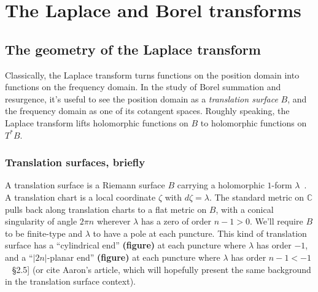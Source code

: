 \documentclass{article}
\theoremstyle{definition}
\newcommand{\C}{\mathbb{C}}
\begin{document}
\section{The Laplace and Borel transforms}\label{sec:Laplace-Borel-general}
\subsection{The geometry of the Laplace transform}

Classically, the Laplace transform turns functions on the position domain into functions on the frequency domain. In the study of Borel summation and resurgence, it's useful to see the position domain as a {\em translation surface} $B$, and the frequency domain as one of its cotangent spaces. Roughly speaking, the Laplace transform lifts holomorphic functions on $B$ to holomorphic functions on $T^* B$.
\subsubsection{Translation surfaces, briefly}

A translation surface is a Riemann surface $B$ carrying a holomorphic $1$-form $\lambda$~\cite{zorich2006flat}. A translation chart is a local coordinate $\zeta$ with $d\zeta = \lambda$. The standard metric on $\C$ pulls back along translation charts to a flat metric on $B$, with a conical singularity of angle $2\pi n$ wherever $\lambda$ has a zero of order $n-1 > 0$. We'll require $B$ to be finite-type and $\lambda$ to have a pole at each puncture. This kind of translation surface has a ``cylindrical end'' \textbf{(figure)} at each puncture where $\lambda$ has order $-1$, and a ``$|2n|$-planar end'' \textbf{(figure)} at each puncture where $\lambda$ has order $n-1 < -1$~\cite{gupta2013meromorphic} \S 2.5] (or cite Aaron's article, which will hopefully present the same background in the translation surface context).
\end{document}
